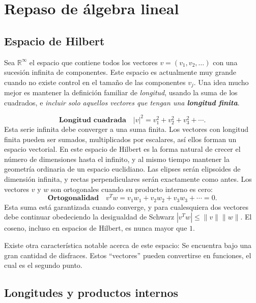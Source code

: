 \documentclass[
	a4paper,
	11pt,
	oneside
]{scrreprt}
\begin{document}
\chapter{Repaso de álgebra lineal}

\section{Espacio de Hilbert}
Sea $\mathbb{R}^\infty$ el espacio que contiene todos los vectores $v=(v_1,v_2,\ldots)$ con una sucesión infinita de componentes. Este espacio es actualmente muy grande cuando no existe control en el tamaño de las componentes $v_j$. Una idea mucho mejor es mantener la definición familiar de \emph{longitud}, usando la suma de los cuadrados, e \emph{incluir solo aquellos vectores que tengan una \textbf{longitud finita}}.

\begin{equation}\label{eq:1}
\textbf{Longitud cuadrada}\quad{\left|v\right|}^2=v_{1}^{2}+v_{2}^{2}+v_{3}^{2}+\cdots.
\end{equation}
Esta serie infinita debe converger a una suma finita. Los vectores con longitud finita pueden ser sumados, multiplicados por escalares, así ellos forman un espacio vectorial. En este espacio de Hilbert es la forma natural de crecer el número de dimensiones hasta el infinito, y al mismo tiempo mantener la geometría ordinaria de un espacio euclidiano. Las elipses serán elipsoides de dimensión infinita, y rectas perpendiculares serán exactamente como antes. Los vectores $v$ y $w$ son ortogonales cuando su producto interno es cero:
\begin{equation}\label{eq:2}
\mathbf{Ortogonalidad}\quad v^{T}w=v_{1}w_{1}+v_{2}w_{2}+v_{3}w_{3}+\cdots=0.
\end{equation}
Esta suma está garantizada cuando converge, y para cualesquiera dos vectores debe continuar obedeciendo la desigualdad de Schwarz $\left|v^{T}w\right|\le\|v\|\|w\|$. El coseno, incluso en espacios de Hilbert, es nunca mayor que $1$.

Existe otra característica notable acerca de este espacio: Se encuentra bajo una gran cantidad de disfraces. Estos ``vectores'' pueden convertirse en funciones, el cual es el segundo punto.

\section{Longitudes y productos internos}
\end{document}
